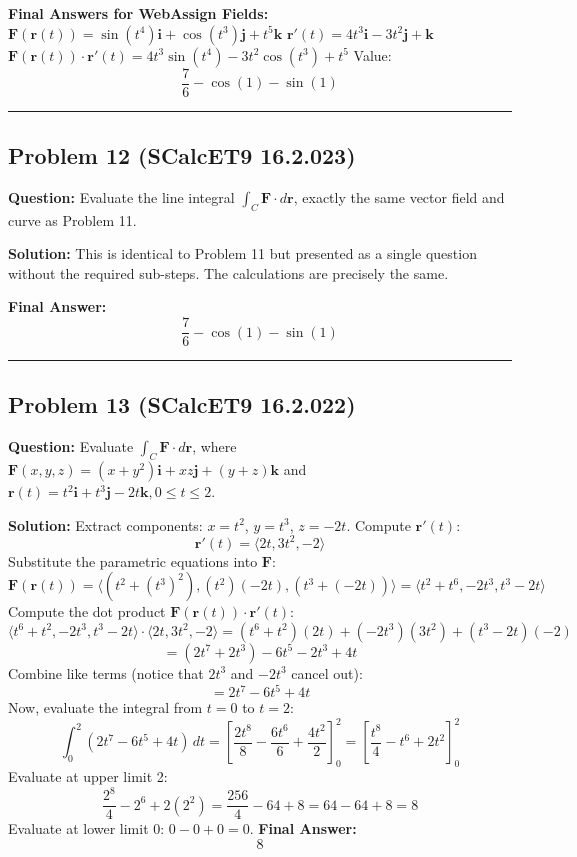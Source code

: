 \documentclass{article}
\begin{document}
\textbf{Final Answers for WebAssign Fields:}
$\mathbf{F}(\mathbf{r}(t)) = \sin(t^4)\mathbf{i} + \cos(t^3)\mathbf{j} + t^5\mathbf{k}$
$\mathbf{r}'(t) = 4t^3\mathbf{i} - 3t^2\mathbf{j} + \mathbf{k}$
$\mathbf{F}(\mathbf{r}(t)) \cdot \mathbf{r}'(t) = 4t^3\sin(t^4) - 3t^2\cos(t^3) + t^5$
Value: 
\[ \frac{7}{6} - \cos(1) - \sin(1) \]

\hrule \vspace{0.5cm}

\subsection{Problem 12 (SCalcET9 16.2.023)}
\textbf{Question:} Evaluate the line integral $\int_C \mathbf{F} \cdot d\mathbf{r}$, exactly the same vector field and curve as Problem 11.

\textbf{Solution:}
This is identical to Problem 11 but presented as a single question without the required sub-steps. The calculations are precisely the same.

\textbf{Final Answer:} 
\[ \frac{7}{6} - \cos(1) - \sin(1) \]

\hrule \vspace{0.5cm}

\subsection{Problem 13 (SCalcET9 16.2.022)}
\textbf{Question:} Evaluate $\int_C \mathbf{F} \cdot d\mathbf{r}$, where $\mathbf{F}(x,y,z) = (x + y^2)\mathbf{i} + xz\mathbf{j} + (y + z)\mathbf{k}$ and $\mathbf{r}(t) = t^2\mathbf{i} + t^3\mathbf{j} - 2t\mathbf{k}, 0 \leq t \leq 2$.

\textbf{Solution:}
Extract components: $x = t^2$, $y = t^3$, $z = -2t$.
Compute $\mathbf{r}'(t)$:
\[ \mathbf{r}'(t) = \langle 2t, 3t^2, -2 \rangle \]
Substitute the parametric equations into $\mathbf{F}$:
\[ \mathbf{F}(\mathbf{r}(t)) = \langle (t^2 + (t^3)^2), (t^2)(-2t), (t^3 + (-2t)) \rangle = \langle t^2 + t^6, -2t^3, t^3 - 2t \rangle \]
Compute the dot product $\mathbf{F}(\mathbf{r}(t)) \cdot \mathbf{r}'(t)$:
\[ \langle t^6 + t^2, -2t^3, t^3 - 2t \rangle \cdot \langle 2t, 3t^2, -2 \rangle = (t^6 + t^2)(2t) + (-2t^3)(3t^2) + (t^3 - 2t)(-2) \]
\[ = (2t^7 + 2t^3) - 6t^5 - 2t^3 + 4t \]
Combine like terms (notice that $2t^3$ and $-2t^3$ cancel out):
\[ = 2t^7 - 6t^5 + 4t \]
Now, evaluate the integral from $t = 0$ to $t = 2$:
\[ \int_0^2 (2t^7 - 6t^5 + 4t) \, dt = \left[ \frac{2t^8}{8} - \frac{6t^6}{6} + \frac{4t^2}{2} \right]_0^2 = \left[ \frac{t^8}{4} - t^6 + 2t^2 \right]_0^2 \]
Evaluate at upper limit 2:
\[ \frac{2^8}{4} - 2^6 + 2(2^2) = \frac{256}{4} - 64 + 8 = 64 - 64 + 8 = 8 \]
Evaluate at lower limit 0: $0 - 0 + 0 = 0$.
\textbf{Final Answer:} 
\[ 8 \]
\end{document}
